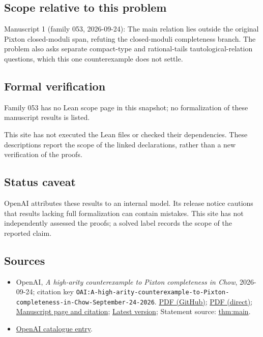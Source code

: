 \documentclass[11pt]{article}
\begin{document}
\subsection{Scope relative to this problem}
Manuscript 1 (family 053, 2026-09-24): The main relation lies outside the original Pixton closed-moduli span, refuting the closed-moduli completeness branch. The problem also asks separate compact-type and rational-tails tautological-relation questions, which this one counterexample does not settle.

\subsection{Formal verification}
Family 053 has no Lean scope page in this snapshot; no formalization of these manuscript results is listed.

This site has not executed the Lean files or checked their dependencies. These descriptions report the scope of the linked declarations, rather than a new verification of the proofs.

\subsection{Status caveat}
OpenAI attributes these results to an internal model. Its release notice cautions that results lacking full formalization can contain mistakes. This site has not independently assessed the proofs; a solved label records the scope of the reported claim.

\subsection{Sources}
\begin{itemize}
\item OpenAI, \emph{A high-arity counterexample to Pixton completeness in Chow}, 2026-09-24; citation key \texttt{OAI:A-high-arity-counterexample-to-Pixton-completeness-in-Chow-September-24-2026}. \href{https://github.com/openai/math/blob/adc7f1241b42e322a6451854ab7e4b4c146bf78a/preprints/A-high-arity-counterexample-to-Pixton-completeness-in-Chow-September-24-2026/paper.pdf}{PDF (GitHub)}; \href{https://github.com/openai/math/raw/adc7f1241b42e322a6451854ab7e4b4c146bf78a/preprints/A-high-arity-counterexample-to-Pixton-completeness-in-Chow-September-24-2026/paper.pdf}{PDF (direct)}; \href{https://github.com/openai/math/blob/adc7f1241b42e322a6451854ab7e4b4c146bf78a/preprints/A-high-arity-counterexample-to-Pixton-completeness-in-Chow-September-24-2026/README.md}{Manuscript page and citation}; \href{https://github.com/openai/math/blob/main/preprints/A-high-arity-counterexample-to-Pixton-completeness-in-Chow-September-24-2026/paper.pdf}{Latest version}; Statement source: \href{https://github.com/openai/math/blob/adc7f1241b42e322a6451854ab7e4b4c146bf78a/preprints/A-high-arity-counterexample-to-Pixton-completeness-in-Chow-September-24-2026/build/sections/01-introduction.tex\#L76}{thm:main}.
\item \href{https://github.com/openai/math/blob/adc7f1241b42e322a6451854ab7e4b4c146bf78a/CONTENTS.md}{OpenAI catalogue entry}.
\end{itemize}
\end{document}
